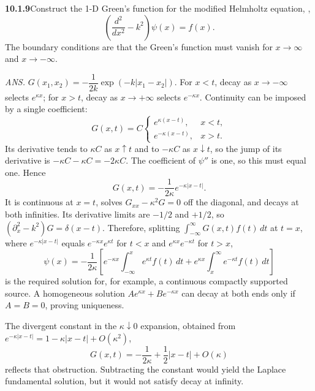 \par\bigskip
\noindent\textbf{10.1.9}\quad Construct the 1-D Green's function for the
modified Helmholtz equation, ,
\[
\left(\frac{d^{2}}{dx^{2}}-k^{2}\right)\psi(x)=f(x).
\]
The boundary conditions are that the Green's function must vanish for
$x\to\infty$ and $x\to-\infty$.
\par\nobreak\hfill\emph{ANS.}\enspace
$G(x_{1},x_{2})=-\dfrac{1}{2k}\exp\left(-k|x_{1}-x_{2}|\right)$.
\solution
{}
For $x<t$, decay as $x\to-\infty$ selects $e^{\kappa x}$;
for $x>t$, decay as $x\to+\infty$ selects $e^{-\kappa x}$.
Continuity can be imposed by a single coefficient:
\[
G(x,t)=C\begin{cases}
e^{\kappa(x-t)},&x<t,\\
e^{-\kappa(x-t)},&x>t.
\end{cases}
\]
Its derivative tends to $\kappa C$ as $x\uparrow t$ and to $-\kappa C$
as $x\downarrow t$, so the jump of its derivative is
$-\kappa C-\kappa C=-2\kappa C$.
The coefficient of $\psi''$ is one, so this must equal one. Hence
\[
\boxed{G(x,t)=-\frac1{2\kappa}e^{-\kappa|x-t|}.}
\]
It is continuous at $x=t$, solves $G_{xx}-\kappa^2G=0$ off the
diagonal, and decays at both infinities. Its derivative limits are
$-1/2$ and $+1/2$, so $(\partial_x^2-k^2)G=\delta(x-t)$.
Therefore, splitting $\int_{-\infty}^\infty G(x,t)f(t)\,dt$ at $t=x$,
where $e^{-\kappa|x-t|}$ equals $e^{-\kappa x}e^{\kappa t}$ for $t<x$
and $e^{\kappa x}e^{-\kappa t}$ for $t>x$,
\[
\psi(x)=-\frac1{2\kappa}\left[
e^{-\kappa x}\int_{-\infty}^x e^{\kappa t}f(t)\,dt
+e^{\kappa x}\int_x^\infty e^{-\kappa t}f(t)\,dt\right]
\]
is the required solution for, for example, a continuous compactly
supported source. A homogeneous solution $Ae^{\kappa x}+Be^{-\kappa x}$
can decay at both ends only if $A=B=0$, proving uniqueness.

The divergent constant in the $\kappa\downarrow0$ expansion, obtained
from $e^{-\kappa|x-t|}=1-\kappa|x-t|+O(\kappa^2)$,
\[
G(x,t)=-\frac1{2\kappa}+\frac12|x-t|+O(\kappa)
\]
reflects that obstruction. Subtracting the constant would yield the
Laplace fundamental solution, but it would not satisfy decay at infinity.

